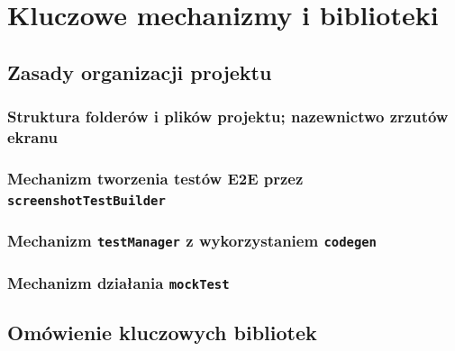 \documentclass[12pt]{report}
\begin{document}
\chapter{Kluczowe mechanizmy i biblioteki}

\section{Zasady organizacji projektu}

\subsection{Struktura folderów i plików projektu; nazewnictwo zrzutów ekranu}

\subsection{Mechanizm tworzenia testów E2E przez \texttt{screenshotTestBuilder}}

\subsection{Mechanizm \texttt{testManager} z wykorzystaniem \texttt{codegen}}

\subsection{Mechanizm działania \texttt{mockTest}}


\section{Omówienie kluczowych bibliotek}
\end{document}
